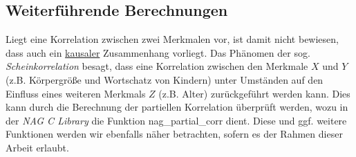 \subsection{Weiterführende Berechnungen}

Liegt eine Korrelation zwischen zwei Merkmalen vor, ist damit nicht bewiesen, dass auch ein \underline{kausaler} Zusammenhang vorliegt. Das Phänomen der sog. {\it Scheinkorrelation} besagt, dass eine Korrelation zwischen den Merkmale $X$ und $Y$ (z.B. Körpergröße und Wortschatz von Kindern) unter Umständen auf den Einfluss eines weiteren Merkmals $Z$ (z.B. Alter) zurückgeführt werden kann. Dies kann durch die Berechnung der partiellen Korrelation überprüft werden, wozu in der {\it NAG C Library} die Funktion nag\_partial\_corr dient. Diese und ggf. weitere Funktionen werden wir ebenfalls näher betrachten, sofern es der Rahmen dieser Arbeit erlaubt.